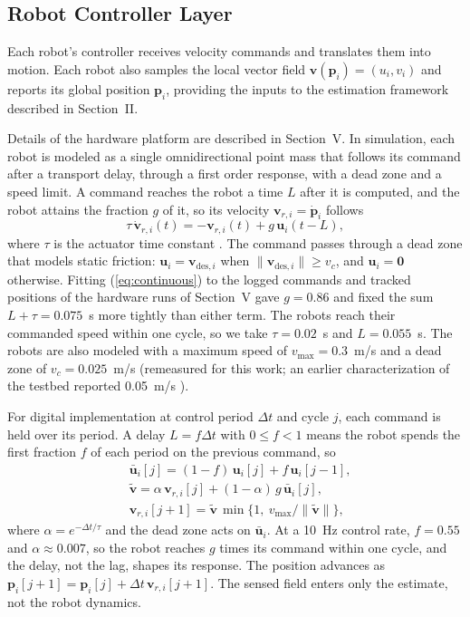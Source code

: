 \documentclass[lettersize,journal]{IEEEtran}
\newcommand{\rev}[1]{#1}
\begin{document}
\subsection{Robot Controller Layer}
\noindent 

Each robot's controller receives velocity commands and translates them into motion. Each robot also samples the local vector field $\mathbf{v}(\mathbf{p}_i) = (u_i, v_i)$ and reports its global position $\mathbf{p}_i$, providing the inputs to the estimation framework described in Section~II.

Details of the hardware platform are described in Section~V. In simulation, each robot is modeled as a single omnidirectional point mass that follows its command after a transport delay, through a first order response, with a dead zone and a speed limit. A command reaches the robot a time $L$ after it is computed, and the robot attains the fraction $g$ of it, so its velocity $\mathbf{v}_{r,i} = \dot{\mathbf{p}}_i$ follows
\begin{equation}
    \tau\,\dot{\mathbf{v}}_{r,i}(t) = -\mathbf{v}_{r,i}(t) + g\,\mathbf{u}_i(t - L),
    \label{eq:continuous}
\end{equation}
where $\tau$ is the actuator time constant \cite{4,7}. The command passes through a dead zone that models static friction: $\mathbf{u}_i = \mathbf{v}_{\text{des},i}$ when $\|\mathbf{v}_{\text{des},i}\| \ge v_c$, and $\mathbf{u}_i = \mathbf{0}$ otherwise. Fitting (\ref{eq:continuous}) to the logged commands and tracked positions of the hardware runs of Section~V gave $g = \rev{0.86}$ and fixed the sum $L + \tau = \rev{0.075}$~s more tightly than either term. The robots reach their commanded speed within one cycle, so we take $\tau = \rev{0.02}$~s and $L = \rev{0.055}$~s. The robots are also modeled with a maximum speed of $v_{\max} = \rev{0.3}$~m/s and a dead zone of $v_c = 0.025$~m/s (remeasured for this work; an earlier characterization of the testbed reported 0.05~m/s \cite{22}).

For digital implementation at control period $\Delta t$ and cycle $j$, each command is held over its period. A delay $L = f\Delta t$ with $0 \le f < 1$ means the robot spends the first fraction $f$ of each period on the previous command, so
\begin{equation}\label{eq:momentum}
\begin{split}
&\bar{\mathbf{u}}_i[j] = (1-f)\,\mathbf{u}_i[j] + f\,\mathbf{u}_i[j-1],\\
&\tilde{\mathbf{v}} = \alpha\,\mathbf{v}_{r,i}[j] + (1-\alpha)\,g\,\bar{\mathbf{u}}_i[j],\\
&\mathbf{v}_{r,i}[j+1] = \tilde{\mathbf{v}}\,\min\{1,\ v_{\max}/\|\tilde{\mathbf{v}}\|\},
\end{split}
\end{equation}
where $\alpha = e^{-\Delta t/\tau}$ and the dead zone acts on $\bar{\mathbf{u}}_i$. At a 10~Hz control rate, $f = \rev{0.55}$ and $\alpha \approx \rev{0.007}$, so the robot reaches $g$ times its command within one cycle, and the delay, not the lag, shapes its response. The position advances as $\mathbf{p}_i[j+1] = \mathbf{p}_i[j] + \Delta t\,\mathbf{v}_{r,i}[j+1]$. The sensed field enters only the estimate, not the robot dynamics.
\end{document}
